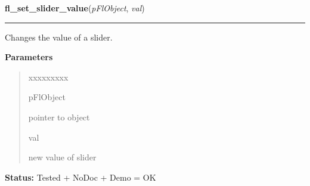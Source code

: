     \label{xformslib:flslider:fl_set_slider_value}

    \vspace{0.5ex}

\hspace{.8\funcindent}\begin{boxedminipage}{\funcwidth}

    \raggedright \textbf{fl\_set\_slider\_value}(\textit{pFlObject}, \textit{val})

    \vspace{-1.5ex}

    \rule{\textwidth}{0.5\fboxrule}
\setlength{\parskip}{2ex}
    Changes the value of a slider.

\setlength{\parskip}{1ex}
      \textbf{Parameters}
      \vspace{-1ex}

      \begin{quote}
        \begin{Ventry}{xxxxxxxxx}

          \item[pFlObject]

          pointer to object

          \item[val]

          new value of slider

        \end{Ventry}

      \end{quote}

\textbf{Status:} Tested + NoDoc + Demo = OK



    \end{boxedminipage}

    \label{xformslib:flslider:fl_get_slider_value}

    \vspace{0.5ex}

